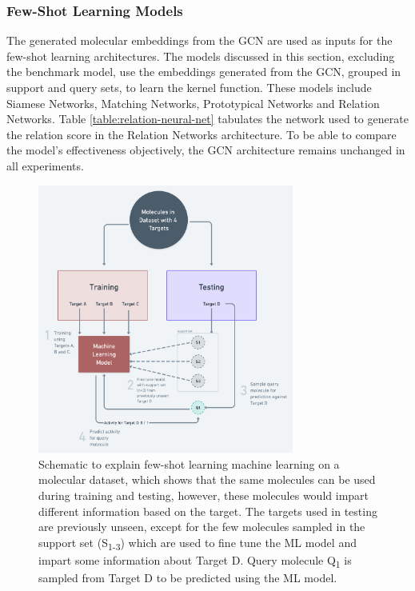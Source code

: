 \subsubsection{Few-Shot Learning Models}

The generated molecular embeddings from the GCN are used as inputs for the few-shot learning architectures. The models discussed in this section, excluding the benchmark model, use the embeddings generated from the GCN, grouped in support and query sets, to learn the kernel function. These models include Siamese Networks, Matching Networks, Prototypical Networks and Relation Networks. Table \ref{table:relation-neural-net} tabulates the network used to generate the relation score in the Relation Networks architecture. To be able to compare the model's effectiveness objectively, the GCN architecture remains unchanged in all experiments.

\begin{figure}[ht!]
	\centering
	\includegraphics[width=0.75\textwidth]{img/Schematic Training.png}
	\caption{Schematic to explain few-shot learning machine learning on a molecular dataset, which shows that the same molecules can be used during training and testing, however, these molecules would impart different information based on the target. The targets used in testing are previously unseen, except for the few molecules sampled in the support set (S\textsubscript{1-3}) which are used to fine tune the ML model and impart some information about Target D. Query molecule Q\textsubscript{1} is sampled from Target D to be predicted using the ML model.}
	\label{fig:schematic-training}
\end{figure}

